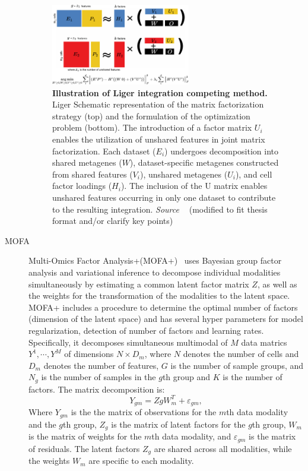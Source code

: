 \begin{description}
    \begin{figure}[!ht]
    	\centering
    	\includegraphics[width=0.6\textwidth]{Alg_Liger/fig}
    	\vspace{0.1cm}
    	\caption[Illustration of Liger integration competing method.]{\textbf{Illustration of Liger integration competing method.} Liger Schematic representation of the matrix factorization strategy (top) and the formulation of the optimization problem (bottom). The introduction of a factor matrix $U_i$ enables the utilization of unshared features in joint matrix factorization. Each dataset ($E_i$) undergoes decomposition into shared metagenes ($W$), dataset-specific metagenes constructed from shared features ($V_i$), unshared metagenes ($U_i$), and cell factor loadings ($H_i$). The inclusion of the U matrix enables unshared features occurring in only one dataset to contribute to the resulting integration. \emph{Source ~\cite{kriebel2022uinmf}} (modified to fit thesis format and/or clarify key points)
    }
    	\label{fig:Alg_Liger}
    \end{figure}

    \item[MOFA]
    Multi-Omics Factor Analysis+(MOFA+)~\cite{argelaguet2020mofa+} uses Bayesian group factor analysis and variational inference to decompose individual modalities simultaneously by estimating a common latent factor matrix $Z$, as well as the weights for the transformation of the modalities to the latent space. MOFA+ includes a procedure to determine the optimal number of factors (dimension of the latent space) and has several hyper parameters for model regularization, detection of number of factors and learning rates. Specifically, it decomposes simultaneous multimodal of $M$ data matrics $Y^1, \cdots, Y^M$ of dimensions $N\times D_m$, where $N$ denotes the number of cells and $D_m$ denotes the number of features, $G$ is the number of sample groups, and $N_g$ is the number of samples in the $g$th group and $K$ is the number of factors. The matrix decomposition is:
    \begin{equation}
    Y_{gm} = ZgW_m^{T} + \varepsilon_{gm}, 
    \end{equation}
    Where $Y_{gm}$ is the the matrix of observations for the $m$th data modality and the $g$th group, $Z_g$ is the matrix of latent factors for the $g$th group, $W_m$ is the matrix of weights for the $m$th data modality, and $\varepsilon_{gm}$ is the matrix of residuals. The latent factors $Z_g$ are shared across all modalities, while the weights $W_m$ are specific to each modality. %
    

\end{description}
